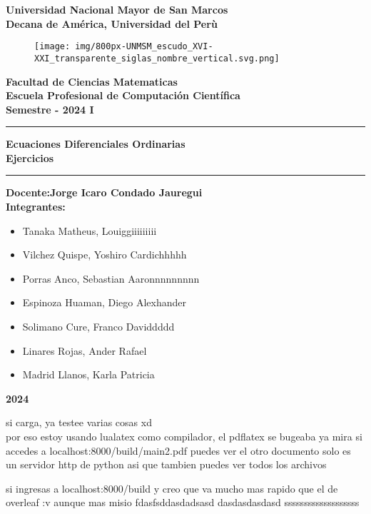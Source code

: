 \documentclass[12pt, a4paper]{article}
\begin{document}

\begin{titlepage}
\begin{center}
{ \LARGE\textbf{Universidad Nacional Mayor de San Marcos}}\\
 \vspace{3.5mm}
{\large \textbf{Decana de América, Universidad del Perù}}\\
  \vspace{3.5mm}
  \begin{figure}[h]
      \centering
      \texttt{[image: img/800px-UNMSM\_escudo\_XVI-XXI\_transparente\_siglas\_nombre\_vertical.svg.png]}
  \end{figure}
{ \Large\textbf{Facultad de Ciencias Matematicas}}\\
 \vspace{3.5mm}
{ \large\textbf{Escuela Profesional de Computación Científica}}\\
 \vspace{3.5mm}
{ \large\textbf{Semestre - 2024 I}}\\
{\rule{\linewidth}{0.55mm}} 
 { \Large\textbf{Ecuaciones Diferenciales Ordinarias\\ Ejercicios}}\\
{\rule{\linewidth}{0.55mm}} 
{ \large\textbf{Docente:Jorge Icaro Condado Jauregui}}\\ \vspace{3.5mm}
{ \large\textbf{Integrantes: }}\\
 \vspace{3.5mm}
\begin{itemize}
    \item Tanaka Matheus, Louiggiiiiiiiii
    \item Vilchez Quispe, Yoshiro Cardichhhhh
    \item Porras Anco, Sebastian Aaronnnnnnnnn
    \item Espinoza Huaman, Diego Alexhander 
    \item Solimano Cure, Franco Daviddddd 
    \item Linares Rojas, Ander Rafael
    \item Madrid Llanos, Karla Patricia 
\end{itemize}
\vfill
{ \huge\textbf{2024}}
\end{center}
\end{titlepage}
\newpage
si carga, ya testee varias cosas xd \\
por eso estoy usando lualatex como compilador, el
pdflatex se bugeaba
ya mira si accedes a localhost:8000/build/main2.pdf puedes ver el otro documento
solo es un servidor http de python asi que tambien puedes ver todos los archivos

si ingresas a localhost:8000/build
y creo que va mucho mas rapido que
el de overleaf :v aunque mas misio
fdasfsddasdadsasd
dasdasdasdasd
sssssssssssssssssss
\end{document}
